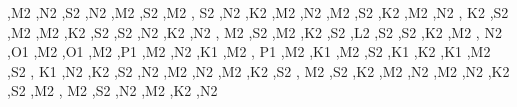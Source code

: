 \textquotesingle{},\textquotesingle{}M2 \textquotesingle{},\textquotesingle{}N2 \textquotesingle{},\textquotesingle{}S2 \textquotesingle{},\textquotesingle{}N2 \textquotesingle{},\textquotesingle{}M2 \textquotesingle{},\textquotesingle{}S2 \textquotesingle{},\textquotesingle{}M2 \textquotesingle{}, \textquotesingle{}S2 \textquotesingle{},\textquotesingle{}N2 \textquotesingle{},\textquotesingle{}K2 \textquotesingle{},\textquotesingle{}M2 \textquotesingle{},\textquotesingle{}N2 \textquotesingle{},\textquotesingle{}M2 \textquotesingle{},\textquotesingle{}S2 \textquotesingle{},\textquotesingle{}K2 \textquotesingle{},\textquotesingle{}M2 \textquotesingle{},\textquotesingle{}N2 \textquotesingle{}, \textquotesingle{}K2 \textquotesingle{},\textquotesingle{}S2 \textquotesingle{},\textquotesingle{}M2 \textquotesingle{},\textquotesingle{}M2 \textquotesingle{},\textquotesingle{}K2 \textquotesingle{},\textquotesingle{}S2 \textquotesingle{},\textquotesingle{}S2 \textquotesingle{},\textquotesingle{}N2 \textquotesingle{},\textquotesingle{}K2 \textquotesingle{},\textquotesingle{}N2 \textquotesingle{}, \textquotesingle{}M2 \textquotesingle{},\textquotesingle{}S2 \textquotesingle{},\textquotesingle{}M2 \textquotesingle{},\textquotesingle{}K2 \textquotesingle{},\textquotesingle{}S2 \textquotesingle{},\textquotesingle{}L2 \textquotesingle{},\textquotesingle{}S2 \textquotesingle{},\textquotesingle{}S2 \textquotesingle{},\textquotesingle{}K2 \textquotesingle{},\textquotesingle{}M2 \textquotesingle{}, \textquotesingle{}N2 \textquotesingle{},\textquotesingle{}O1 \textquotesingle{},\textquotesingle{}M2 \textquotesingle{},\textquotesingle{}O1 \textquotesingle{},\textquotesingle{}M2 \textquotesingle{},\textquotesingle{}P1 \textquotesingle{},\textquotesingle{}M2 \textquotesingle{},\textquotesingle{}N2 \textquotesingle{},\textquotesingle{}K1 \textquotesingle{},\textquotesingle{}M2 \textquotesingle{}, \textquotesingle{}P1 \textquotesingle{},\textquotesingle{}M2 \textquotesingle{},\textquotesingle{}K1 \textquotesingle{},\textquotesingle{}M2 \textquotesingle{},\textquotesingle{}S2 \textquotesingle{},\textquotesingle{}K1 \textquotesingle{},\textquotesingle{}K2 \textquotesingle{},\textquotesingle{}K1 \textquotesingle{},\textquotesingle{}M2 \textquotesingle{},\textquotesingle{}S2 \textquotesingle{}, \textquotesingle{}K1 \textquotesingle{},\textquotesingle{}N2 \textquotesingle{},\textquotesingle{}K2 \textquotesingle{},\textquotesingle{}S2 \textquotesingle{},\textquotesingle{}N2 \textquotesingle{},\textquotesingle{}M2 \textquotesingle{},\textquotesingle{}N2 \textquotesingle{},\textquotesingle{}M2 \textquotesingle{},\textquotesingle{}K2 \textquotesingle{},\textquotesingle{}S2 \textquotesingle{}, \textquotesingle{}M2 \textquotesingle{},\textquotesingle{}S2 \textquotesingle{},\textquotesingle{}K2 \textquotesingle{},\textquotesingle{}M2 \textquotesingle{},\textquotesingle{}N2 \textquotesingle{},\textquotesingle{}M2 \textquotesingle{},\textquotesingle{}N2 \textquotesingle{},\textquotesingle{}K2 \textquotesingle{},\textquotesingle{}S2 \textquotesingle{},\textquotesingle{}M2 \textquotesingle{}, \textquotesingle{}M2 \textquotesingle{},\textquotesingle{}S2 \textquotesingle{},\textquotesingle{}N2 \textquotesingle{},\textquotesingle{}M2 \textquotesingle{},\textquotesingle{}K2 \textquotesingle{},\textquotesingle{}N2 